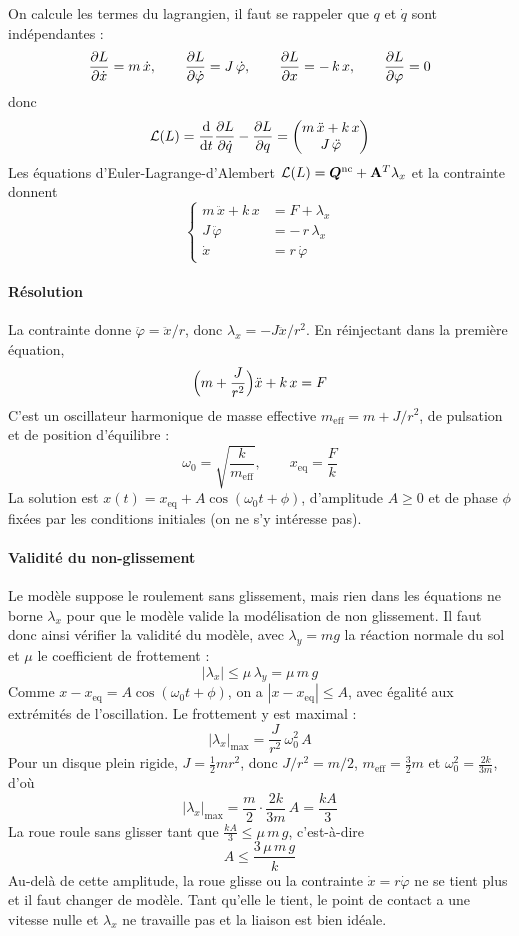 On calcule les termes du lagrangien, il faut se rappeler que $q$ et $\dot q$
sont indépendantes :
\[
    \frac{\partial L}{\partial \dot x} = m\,\dot x,
    \qquad
    \frac{\partial L}{\partial \dot\varphi} = J\,\dot\varphi,
    \qquad
    \frac{\partial L}{\partial x} = -\,k\,x,
    \qquad
    \frac{\partial L}{\partial \varphi} = 0
\]
donc
\[
    \mathcal{L}(L) = \frac{\mathrm{d}}{\mathrm{d} t}\frac{\partial L}{\partial \dot q} - \frac{\partial L}{\partial q}
    = \begin{pmatrix} m\,\ddot x + k\,x\\ J\,\ddot\varphi \end{pmatrix}
\]
Les équations d'Euler-Lagrange-d'Alembert
$\mathcal{L}(L) = \bm{Q}^{\mathrm{nc}} + \mathbf{A}^T\lambda_x$ et la
contrainte donnent
\[
    \left\{
    \begin{aligned}
        m\,\ddot x + k\,x &= F + \lambda_x\\
        J\,\ddot\varphi &= -\,r\,\lambda_x\\
        \dot x &= r\,\dot\varphi
    \end{aligned}
    \right.
\]

\paragraph{Résolution}

La contrainte donne $\ddot\varphi = \ddot x/r$, donc
$\lambda_x = -J\ddot x/r^2$. En réinjectant dans la première équation,
\[
    \Bigl(m + \frac{J}{r^2}\Bigr)\ddot x + k\,x = F
\]
C'est un oscillateur harmonique de masse effective
$m_{\mathrm{eff}} = m + J/r^2$, de pulsation et de position d'équilibre :
\[
    \omega_0 = \sqrt{\frac{k}{m_{\mathrm{eff}}}},
    \qquad
    x_{\mathrm{eq}} = \frac{F}{k}
\]
La solution est $x(t) = x_{\mathrm{eq}} + A\cos(\omega_0 t + \phi)$,
d'amplitude $A\geq 0$ et de phase $\phi$ fixées par les conditions
initiales (on ne s'y intéresse pas).

\paragraph{Validité du non-glissement}

Le modèle suppose le roulement sans glissement, mais rien dans les
équations ne borne $\lambda_x$ pour que le modèle valide la modélisation de non glissement. Il faut donc ainsi vérifier la validité du modèle, avec $\lambda_y = m g$ la réaction normale du sol et $\mu$ le
coefficient de frottement :
\[
    |\lambda_x| \leq \mu\,\lambda_y = \mu\,m\,g
\]
Comme $x - x_{\mathrm{eq}} = A\cos(\omega_0 t + \phi)$, on a
$|x - x_{\mathrm{eq}}|\leq A$, avec égalité aux extrémités de
l'oscillation. Le frottement y est maximal :
\[
    |\lambda_x|_{\max} = \frac{J}{r^2}\,\omega_0^2\,A
\]
Pour un disque plein rigide, $J = \tfrac12 m r^2$, donc $J/r^2 = m/2$,
$m_{\mathrm{eff}} = \tfrac32 m$ et $\omega_0^2 = \frac{2k}{3m}$, d'où
\[
    |\lambda_x|_{\max} = \frac{m}{2}\cdot\frac{2k}{3m}\,A = \frac{k A}{3}
\]
La roue roule sans glisser tant que $\frac{kA}{3}\leq\mu\,m\,g$,
c'est-à-dire
\[
    A \leq \frac{3\,\mu\,m\,g}{k}
\]
Au-delà de cette amplitude, la roue glisse ou la contrainte $\dot x = r\dot\varphi$ ne
se tient plus et il faut changer de modèle. Tant qu'elle le tient, le point
de contact a une vitesse nulle et $\lambda_x$ ne travaille pas et la
liaison est bien idéale.
\newpage

